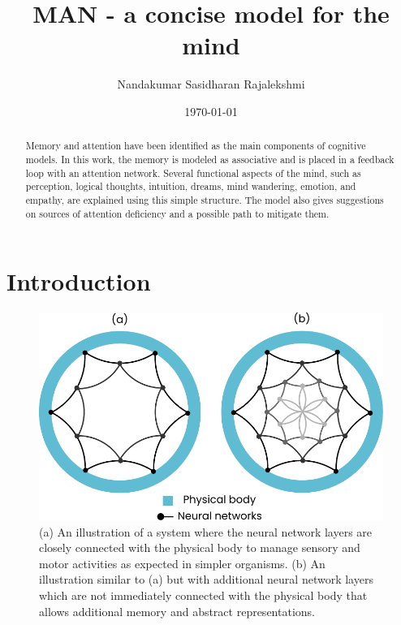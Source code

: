 \documentclass[reprint,amsmath,amssymb,apr,aip,onecolumn, 11pt]{revtex4-1}
\begin{document}
	
	\title{MAN - a concise model for the mind}
	
	\author{Nandakumar Sasidharan Rajalekshmi}
	

	
	
	\date{\today}
	\begin{abstract}
	Memory and attention have been identified as the main components of cognitive models. In this work, the memory is modeled as associative and is placed in a feedback loop with an attention network. Several functional aspects of the mind, such as perception, logical thoughts, intuition, dreams, mind wandering, emotion, and empathy, are explained using this simple structure. The model also gives suggestions on sources of attention deficiency and a possible path to mitigate them.
		
	\end{abstract}
	
	\maketitle
	\section{Introduction}
	
	
	
	\begin{figure}[h!]
		\centerline{\includegraphics[width=0.65\linewidth]{figures/figure_man_animal_brain.pdf}}
		\caption{(a) An illustration of a system where the neural network layers are closely connected with the physical body to manage sensory and motor activities as expected in simpler organisms. (b) An illustration similar to (a) but with additional neural network layers which are not immediately connected with the physical body that allows additional memory and abstract representations. }
		\label{fig:man_animal}
	\end{figure}
	
\end{document}
